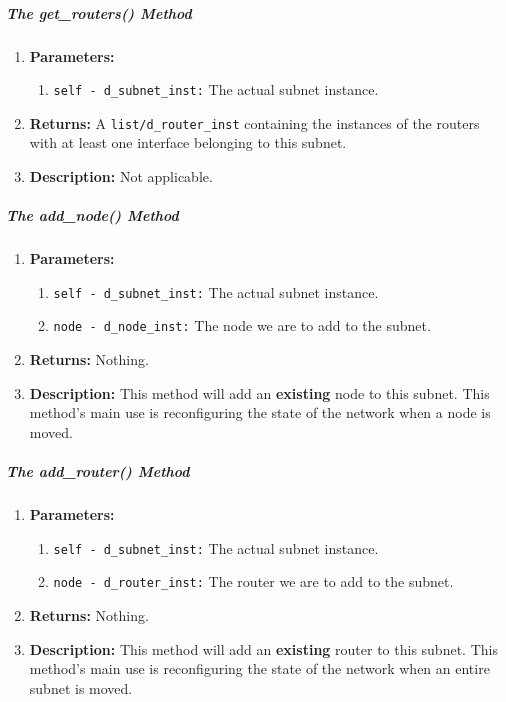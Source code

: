         \subparagraph{The get\_routers() Method}
            \begin{enumerate}
                \item \textbf{Parameters:}
                \begin{enumerate}
                    \item \texttt{self - d\_subnet\_inst:} The actual subnet instance.
                \end{enumerate}
                \item \textbf{Returns:} A \texttt{list/d\_router\_inst} containing the instances of the routers with at least one interface belonging to this subnet.
                \item \textbf{Description:} Not applicable.
            \end{enumerate}

        \subparagraph{The add\_node() Method}
            \begin{enumerate}
                \item \textbf{Parameters:}
                \begin{enumerate}
                    \item \texttt{self - d\_subnet\_inst:} The actual subnet instance.
                    \item \texttt{node - d\_node\_inst:} The node we are to add to the subnet.
                \end{enumerate}
                \item \textbf{Returns:} Nothing.
                \item \textbf{Description:} This method will add an \textbf{existing} node to this subnet. This method's main use is reconfiguring the state of the network when a node is moved.
            \end{enumerate}

        \subparagraph{The add\_router() Method}
            \begin{enumerate}
                \item \textbf{Parameters:}
                \begin{enumerate}
                    \item \texttt{self - d\_subnet\_inst:} The actual subnet instance.
                    \item \texttt{node - d\_router\_inst:} The router we are to add to the subnet.
                \end{enumerate}
                \item \textbf{Returns:} Nothing.
                \item \textbf{Description:} This method will add an \textbf{existing} router to this subnet. This method's main use is reconfiguring the state of the network when an entire subnet is moved.
            \end{enumerate}

